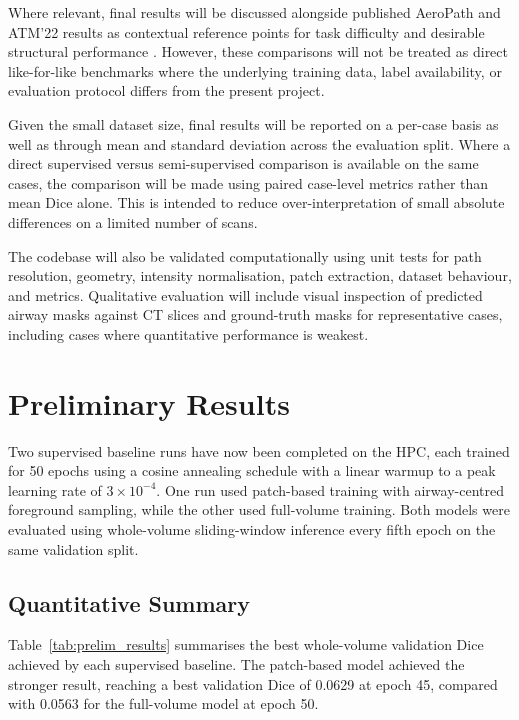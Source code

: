 \documentclass[11pt,a4paper]{article}
\begin{document}
Where relevant, final results will be discussed alongside published AeroPath and ATM'22 results as contextual reference points for task difficulty and desirable structural performance \cite{Stoverud2024AeroPath, Zhang2023ATM22}. However, these comparisons will not be treated as direct like-for-like benchmarks where the underlying training data, label availability, or evaluation protocol differs from the present project.

Given the small dataset size, final results will be reported on a per-case basis as well as through mean and standard deviation across the evaluation split. Where a direct supervised versus semi-supervised comparison is available on the same cases, the comparison will be made using paired case-level metrics rather than mean Dice alone. This is intended to reduce over-interpretation of small absolute differences on a limited number of scans.

The codebase will also be validated computationally using unit tests for path resolution, geometry, intensity normalisation, patch extraction, dataset behaviour, and metrics. Qualitative evaluation will include visual inspection of predicted airway masks against CT slices and ground-truth masks for representative cases, including cases where quantitative performance is weakest.

\section{Preliminary Results}

Two supervised baseline runs have now been completed on the HPC, each trained for 50 epochs using a cosine annealing schedule with a linear warmup to a peak learning rate of $3 \times 10^{-4}$. One run used patch-based training with airway-centred foreground sampling, while the other used full-volume training. Both models were evaluated using whole-volume sliding-window inference every fifth epoch on the same validation split.

\subsection{Quantitative Summary}

Table~\ref{tab:prelim_results} summarises the best whole-volume validation Dice achieved by each supervised baseline. The patch-based model achieved the stronger result, reaching a best validation Dice of 0.0629 at epoch 45, compared with 0.0563 for the full-volume model at epoch 50.
\end{document}
